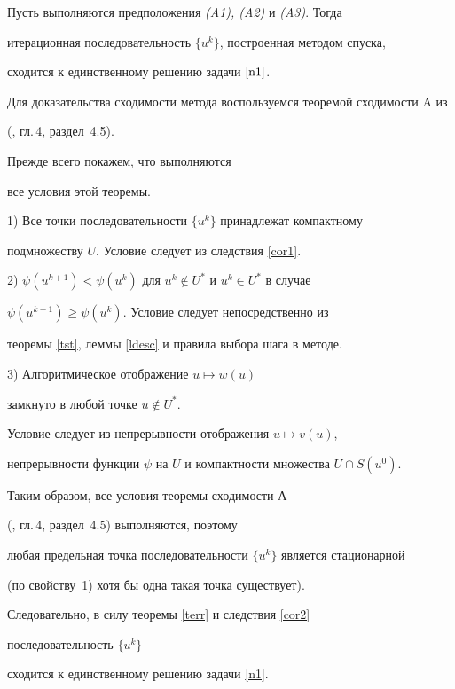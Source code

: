 \begin{thms}


\label{thms2} 


Пусть выполняются предположения {\em (A1), (A2)} и {\em (A3)}. Тогда 


итерационная последовательность $\{u^k\}$, построенная методом спуска, 


сходится к единственному решению задачи $\ref{n1}$.


\end{thms} 





\begin{pf}


Для доказательства сходимости метода воспользуемся теоремой сходимости A из 


(\cite{Zan69}, гл.\,4, раздел~4.5). 


Прежде всего покажем, что выполняются 


все условия этой теоремы.





1) Все точки последовательности $\{u^k\}$ принадлежат компактному 


подмножеству $U$. Условие следует из следствия \ref{cor1}.





2) $\psi(u^{k+1}) < \psi(u^k)$ для $u^k \notin U^*$ и $u^k \in U^*$ в случае 


$\psi(u^{k+1}) \ge \psi(u^k)$. Условие следует непосредственно из 


теоремы \ref{tst}, леммы \ref{ldesc} и правила выбора шага в методе.





3) Алгоритмическое отображение $u \mapsto w(u)$ 


замкнуто в любой точке $u \notin U^*$.


Условие следует из непрерывности отображения $u \mapsto v(u)$,


непрерывности функции $\psi$ на $U$ и компактности множества $U \cap S(u^0)$.





Таким образом, все условия теоремы сходимости А 


(\cite{Zan69}, гл.\,4, раздел~4.5) выполняются, поэтому 


любая предельная точка последовательности $\{u^k\}$ является стационарной 


(по свойству~1) хотя бы одна такая точка существует). 


Следовательно, в силу теоремы \ref{terr} и следствия \ref{cor2}


последовательность $\{u^k\}$


сходится к единственному решению задачи \ref{n1}.


\end{pf}





